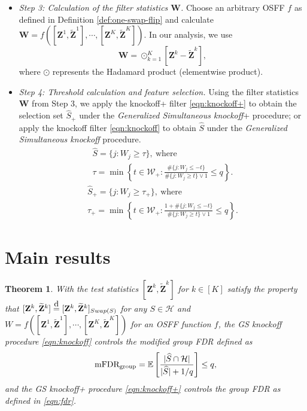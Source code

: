 \documentclass[11pt]{article}
\theoremstyle{plain}
\newtheorem{theorem}{Theorem}[section]
\theoremstyle{definition}
\theoremstyle{remark}
\newcommand{\EE}[1]{\mathbb{E}\left[{#1}\right]} %
\def\Z{\mathbf{Z}}
\def\W{\mathbf{W}}
\newcommand\eqd{\stackrel{\mathclap{\normalfont\mbox{d}}}{=}}
\newcommand{\0}{\mathbf{0}}
\newcommand{\fdr}{\textnormal{FDR}}
\newcommand{\gfdr}{\fdr_{\textnormal{group}}}
\begin{document}
\begin{itemize}
    \item \textit{Step 3: Calculation of the filter statistics $\W$.} Choose an arbitrary OSFF $f$ as defined in Definition \ref{def:one-swap-flip} and calculate $\W=f([\Z^1,\widetilde{\Z}^1],\cdots,[\Z^K,\widetilde{\Z}^K])$. In our analysis, we use 
    \begin{equation}
    \W=\odot_{k=1}^K [\Z^k-\widetilde{\Z}^k],
    \end{equation}
    where $\odot$ represents the Hadamard product (elementwise product).
  
    \item \textit{Step 4: Threshold calculation and feature selection.} Using the filter statistics $\W$ from Step 3, we apply the knockoff+ filter \eqref{eqn:knockoff+} to obtain the selection set $\widehat{S}_+$ under the \textit{Generalized Simultaneous knockoff}+ procedure; or apply the knockoff filter \eqref{eqn:knockoff} to obtain $\widehat{S}$ under the \textit{Generalized Simultaneous knockoff} procedure.
    \begin{multline}\label{eqn:knockoff}
   \widehat{S} = \{j: W_j \geq \tau\},~\text{where}~\\ \tau = \min\left\{t \in \mathcal{W}_+: \frac{\#\{j:W_j \leq -t\}}{\#\{j:W_j\geq t\}\vee 1}\leq q\right\} .
\end{multline}
\begin{multline}\label{eqn:knockoff+}
   \widehat{S}_+ = \{j: W_j \geq \tau_+\}, ~\text{where}~ \\ \tau_+ = \min\left\{t \in \mathcal{W}_+: \frac{1+\#\{j:W_j \leq -t\}}{\#\{j:W_j\geq t\}\vee 1}\leq q\right\} .
\end{multline}
\end{itemize}

 
\section{Main results}
\begin{theorem}\label{thm:1}
With the test statistics $[\Z^k,\widetilde{\Z}^k]$ for $k\in [K]$ satisfy the property that $[\Z^k,\widetilde{\Z}^k]\eqd [\Z^k,\widetilde{\Z}^k]_{Swap(S)}$ for any $S\in \mathcal{H}$ and $W=f([\Z^1,\widetilde{\Z}^1],\cdots,[\Z^K,\widetilde{\Z}^K])$ for an OSFF function $f$, the \textit{GS knockoff} procedure \eqref{eqn:knockoff} 
controls the modified group FDR defined as
\begin{equation}\label{eqn:mfdr}
\textnormal{m}\gfdr=\EE{\frac{|\widehat{S}\cap \mathcal{H}|}{|\widehat{S}|+1/q}}\leq q, \end{equation}
and the \textit{GS knockoff}+ procedure \eqref{eqn:knockoff+} controls the group FDR as defined in \eqref{eqn:fdr}.
\end{theorem}
\end{document}
